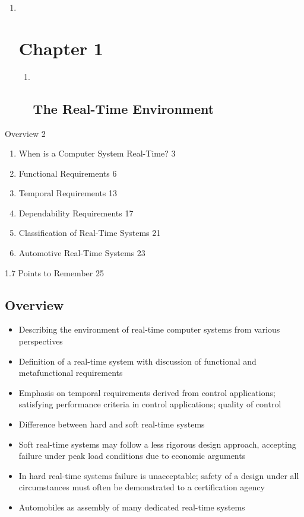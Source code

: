 \begin{enumerate}
\item ~
  \section{Chapter 1}\label{chapter-1}

  \begin{enumerate}
  \item ~
    \subsection{The Real-Time
    Environment}\label{the-real-time-environment}
  \end{enumerate}
\end{enumerate}

Overview 2

\begin{enumerate}
\def\labelenumi{\arabic{enumi}.}
\item
  When is a Computer System Real-Time? 3
\item
  Functional Requirements 6
\item
  Temporal Requirements 13
\item
  Dependability Requirements 17
\item
  Classification of Real-Time Systems 21
\item
  Automotive Real-Time Systems 23
\end{enumerate}

1.7 Points to Remember 25

\subsection{Overview}\label{overview}

\begin{itemize}
\item
  Describing the environment of real-time computer systems from various
  perspectives
\item
  Definition of a real-time system with discussion of functional and
  metafunctional requirements
\item
  Emphasis on temporal requirements derived from control applications;
  satisfying performance criteria in control applications; quality of
  control
\item
  Difference between hard and soft real-time systems
\item
  Soft real-time systems may follow a less rigorous design approach,
  accepting failure under peak load conditions due to economic arguments
\item
  In hard real-time systems failure is unacceptable; safety of a design
  under all circumstances must often be demonstrated to a certification
  agency
\item
  Automobiles as assembly of many dedicated real-time systems
\end{itemize}

